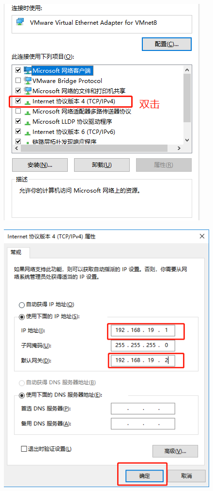 \documentclass[12pt, openany, oneside]{book}
\begin{document}
\begin{figure}[H]
    \centering
    \includegraphics[scale=0.7]{img/Chapter1/1-4/9.png}
\end{figure}

\begin{figure}[H]
    \centering
    \includegraphics[scale=0.6]{img/Chapter1/1-4/10.png}
\end{figure}
\end{document}
